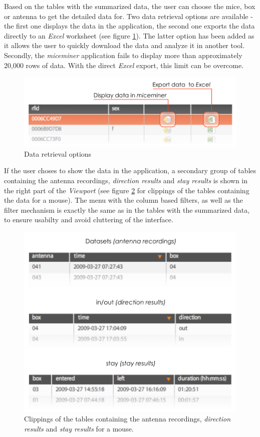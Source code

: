 Based on the tables with the summarized data, the user can choose the mice, box or antenna to get the detailed data for. Two data retrieval options are available - the first one displays the data in the application, the second one exports the data directly to an \textit{Excel} worksheet (see figure \ref{fig:get_data_options}). The latter option has been added as it allows the user to quickly download the data and analyze it in another tool. Secondly, the \textit{miceminer} application fails to display more than approximately 20,000 rows of data. With the direct \textit{Excel} export, this limit can be overcome.   

\begin{figure}[htpb]
\begin{center}
  \includegraphics[width=.75\textwidth]{assets/pdf/get_data_options.pdf}
  \caption{Data retrieval options}
  \label{fig:get_data_options}
\end{center}
\end{figure}

If the user choses to show the data in the application, a secondary group of tables containing the antenna recordings, \textit{direction results} and \textit{stay results} is shown in the right part of the \textit{Viewport} (see figure \ref{fig:overview_data} for clippings of the tables containing the data for a mouse). The menu with the column based filters, as well as the filter mechanism is exactly the same as in the tables with the summarized data, to ensure usabilty and avoid cluttering of the interface. 

\begin{figure}[htpb]
\begin{center}
  \includegraphics[width=.75\textwidth]{assets/pdf/overview_data.pdf}
  \caption{Clippings of the tables containing the antenna recordings, \textit{direction results} and \textit{stay results} for a mouse.}
  \label{fig:overview_data}
\end{center}
\end{figure}  

